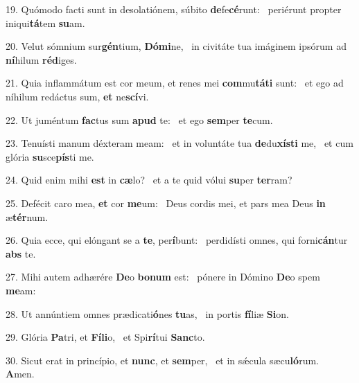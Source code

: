 19. Quómodo facti sunt in desolatiónem, súbito \textbf{de}fe\textbf{cé}runt: \ast\  periérunt propter iniqui\textbf{tá}tem \textbf{su}am.\

20. Velut sómnium sur\textbf{gén}tium, \textbf{Dó}\textbf{mi}ne, \ast\  in civitáte tua imáginem ipsórum ad \textbf{ní}hilum \textbf{réd}iges.\

21. Quia inflammátum est cor meum, et renes mei \textbf{com}mu\textbf{tá}\textbf{ti} sunt: \ast\  et ego ad níhilum redáctus sum, \textbf{et} ne\textbf{scí}vi.\

22. Ut juméntum \textbf{fac}tus sum \textbf{a}\textbf{pud} te: \ast\  et ego \textbf{sem}per \textbf{te}cum.\

23. Tenuísti manum déxteram meam: \dag\  et in voluntáte tua \textbf{de}du\textbf{xís}\textbf{ti} me, \ast\  et cum glória \textbf{su}sce\textbf{pís}ti me.\

24. Quid enim mihi \textbf{est} in \textbf{cæ}lo? \ast\  et a te quid vólui \textbf{su}per \textbf{ter}ram?\

25. Defécit caro mea, \textbf{et} cor \textbf{me}um: \ast\  Deus cordis mei, et pars mea Deus \textbf{in} æ\textbf{tér}num.\

26. Quia ecce, qui elóngant se a \textbf{te}, per\textbf{í}bunt: \ast\  perdidísti omnes, qui forni\textbf{cán}tur \textbf{abs} te.\

27. Mihi autem adhærére \textbf{De}o \textbf{bo}\textbf{num} est: \ast\  pónere in Dómino \textbf{De}o spem \textbf{me}am:\

28. Ut annúntiem omnes prædicati\textbf{ó}nes \textbf{tu}as, \ast\  in portis \textbf{fí}liæ \textbf{Si}on.\

29. Glória \textbf{Pa}tri, et \textbf{Fí}\textbf{li}o, \ast\  et Spi\textbf{rí}tui \textbf{Sanc}to.\

30. Sicut erat in princípio, et \textbf{nunc}, et \textbf{sem}per, \ast\  et in sǽcula sæcu\textbf{ló}rum. \textbf{A}men.\

